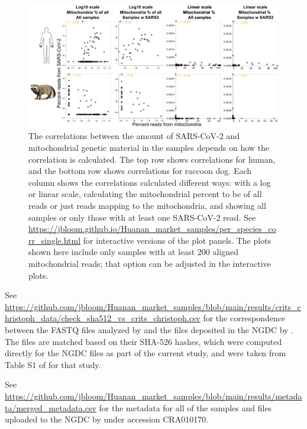 \documentclass[9pt,twocolumn,twoside]{gsajnl_modified}
\begin{document}
\clearpage

\begin{figure}
\includegraphics[width=\linewidth]{figures/different_corrs/correlations.pdf}
\caption{
The correlations between the amount of SARS-CoV-2 and mitochondrial genetic material in the samples depends on how the correlation is calculated.
The top row shows correlations for human, and the bottom row shows correlations for raccoon dog.
Each column shows the correlations calculated different ways: with a log or linear scale, calculating the mitochondrial percent to be of all reads or just reads mapping to the mitochondria, and showing all samples or only those with at least one SARS-CoV-2 read.
See \url{https://jbloom.github.io/Huanan_market_samples/per_species_corr_single.html} for interactive versions of the plot panels.
The plots shown here include only samples with at least 200 aligned mitochondrial reads; that option can be adjusted in the interactive plots.
\label{fig:different_corrs}
}
\end{figure}

\clearpage

\begin{table}
\caption{
See \url{https://github.com/jbloom/Huanan_market_samples/blob/main/results/crits_christoph_data/check_sha512_vs_crits_christoph.csv} for the correspondence between the FASTQ files analyzed by \citet{crits2023genetic} and the files deposited in the NGDC by \citet{liu2023surveillance}.
The files are matched based on their SHA-526 hashes, which were computed directly for the NGDC files as part of the current study, and were taken from Table S1 of \citet{crits2023genetic} for that study.
\label{tab:sha526}
}
\end{table}

\begin{table}
\caption{
See \url{https://github.com/jbloom/Huanan_market_samples/blob/main/results/metadata/merged_metadata.csv} for the metadata for all of the samples and files uploaded to the NGDC by \citet{liu2023surveillance} under accession CRA010170.
\label{tab:metadata}
}
\end{table}
\end{document}

